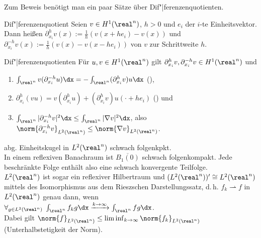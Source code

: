\linie

\begin{Bem}
    Zum Beweis benötigt man ein paar Sätze über Dif"|ferenzenquotienten.
\end{Bem}

\begin{Def}{Dif"|ferenzenquotient}
    Seien $v \in H^1(\real^n)$, $h > 0$ und $e_i$ der $i$-te Einheitsvektor.\\
    Dann heißen
    $\partial_{x_i}^h v(x) := \frac{1}{h} (v(x + he_i) - v(x))$ und
    $\partial_{x_i}^{-h} v(x) := \frac{1}{h} (v(x) - v(x - he_i))$
     von $v$ zur Schrittweite $h$.
\end{Def}

\begin{Lemma}{Dif"|ferenzenquotienten}
    Für $u, v \in H^1(\real^n)$ gilt
    $\partial_{x_i}^h v, \partial_{x_i}^{-h} v \in H^1(\real^n)$ und
    \begin{enumerate}
        \item
        $\int_{\real^n} v (\partial_{x_i}^{-h} u)\dx = -\int_{\real^n} (\partial_{x_i}^h v) u \dx$
        (),
        
        \item
        $\partial_{x_i}^h (vu)
        = v (\partial_{x_i}^h u) + (\partial_{x_i}^h v) u(\cdot + he_i)$
        () und
        
        \item
        $\int_{\real^n} |\partial_{x_i}^{-h} v|^2 \dx \le \int_{\real^n} |\nabla v|^2 \dx$,
        also $\norm{\partial_{x_i}^{-h} v}_{L^2(\real^n)} \le \norm{\nabla v}_{L^2(\real^n)}$.
    \end{enumerate}
\end{Lemma}

\begin{Lemma}{abg. Einheitskugel in $L^2(\real^n)$ schwach folgenkpkt.}\\
    In einem reflexiven Banachraum ist $\overline{B_1(0)}$ schwach folgenkompakt.
    Jede beschränkte Folge enthält also eine schwach konvergente Teilfolge.\\
    $L^2(\real^n)$ ist sogar ein reflexiver Hilbertraum und $(L^2(\real^n))' \cong L^2(\real^n)$
    mittels des Isomorphismus aus dem Rieszschen Darstellungssatz, d.\,h.
    $f_k \rightharpoonup f$ in $L^2(\real^n)$ genau dann, wenn\\
    $\forall_{g \in L^2(\real^n)}\; \int_{\real^n} f_k g\dx \xrightarrow{k \to \infty}
    \int_{\real^n} fg\dx$.\\
    Dabei gilt $\norm{f}_{L^2(\real^n)} \le \liminf_{k \to \infty} \norm{f_k}_{L^2(\real^n)}$
    (Unterhalbstetigkeit der Norm).
\end{Lemma}


